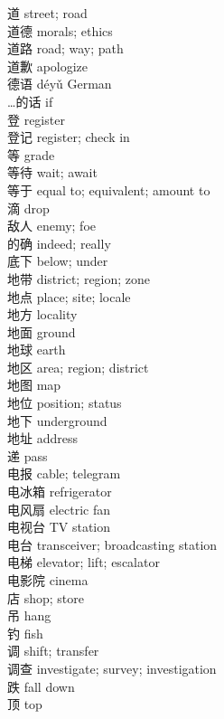 道 \quad street; road\\
道德 \quad morals; ethics\\
道路 \quad road; way; path\\
道歉 \quad apologize\\
德语 \quad déyǔ \quad German\\
…的话 \quad if\\
登 \quad register\\
登记 \quad register; check in\\
等 \quad grade\\
等待 \quad wait; await\\
等于 \quad equal to; equivalent; amount to\\
滴 \quad drop\\
敌人 \quad enemy; foe\\
的确 \quad indeed; really\\
底下 \quad below; under\\
地带 \quad district; region; zone\\
地点 \quad place; site; locale\\
地方 \quad locality\\
地面 \quad ground\\
地球 \quad earth\\
地区 \quad area; region; district\\
地图 \quad map\\
地位 \quad position; status\\
地下 \quad underground\\
地址 \quad address\\
递 \quad pass\\
电报 \quad cable; telegram\\
电冰箱 \quad refrigerator\\
电风扇 \quad electric fan\\
电视台 \quad TV station\\
电台 \quad transceiver; broadcasting station\\
电梯 \quad elevator; lift; escalator\\
电影院 \quad cinema\\
店 \quad shop; store\\
吊 \quad hang\\
钓 \quad fish\\
调 \quad shift; transfer\\
调查 \quad investigate; survey; investigation\\
跌 \quad fall down\\
顶 \quad top\\
